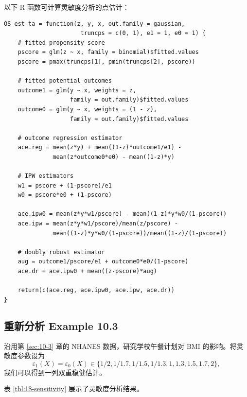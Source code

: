 以下 R 函数可计算灵敏度分析的点估计：

\begin{verbatim}
OS_est_ta = function(z, y, x, out.family = gaussian,
                      truncps = c(0, 1), e1 = 1, e0 = 1) {
    # fitted propensity score
    pscore = glm(z ~ x, family = binomial)$fitted.values
    pscore = pmax(truncps[1], pmin(truncps[2], pscore))

    # fitted potential outcomes
    outcome1 = glm(y ~ x, weights = z,
                   family = out.family)$fitted.values
    outcome0 = glm(y ~ x, weights = (1 - z),
                   family = out.family)$fitted.values

    # outcome regression estimator
    ace.reg = mean(z*y) + mean((1-z)*outcome1/e1) -
              mean(z*outcome0*e0) - mean((1-z)*y)

    # IPW estimators
    w1 = pscore + (1-pscore)/e1
    w0 = pscore*e0 + (1-pscore)

    ace.ipw0 = mean(z*y*w1/pscore) - mean((1-z)*y*w0/(1-pscore))
    ace.ipw = mean(z*y*w1/pscore)/mean(z/pscore) -
              mean((1-z)*y*w0/(1-pscore))/mean((1-z)/(1-pscore))

    # doubly robust estimator
    aug = outcome1/pscore/e1 + outcome0*e0/(1-pscore)
    ace.dr = ace.ipw0 + mean((z-pscore)*aug)

    return(c(ace.reg, ace.ipw0, ace.ipw, ace.dr))
}
\end{verbatim}

\subsection{重新分析 Example 10.3}\label{sec:18-revisit-example-10-3}

沿用第 \cref{sec:10-3} 章的 NHANES 数据，研究学校午餐计划对 BMI 的影响。将灵敏度参数设为
\[
\varepsilon_1(X) = \varepsilon_0(X) \in \{1/2, 1/1.7, 1/1.5, 1/1.3, 1, 1.3, 1.5, 1.7, 2\} ,
\]
我们可以得到一列双重稳健估计。

表 \ref{tbl:18-sensitivity} 展示了灵敏度分析结果。

